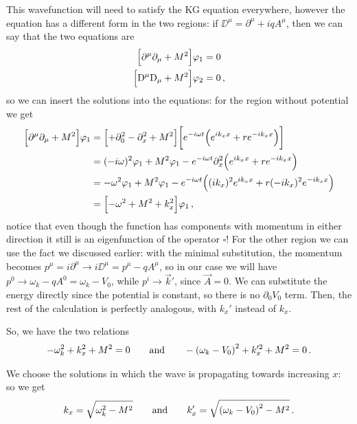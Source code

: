 \documentclass[main.tex]{subfiles}
\begin{document}
This wavefunction will need to satisfy the KG equation everywhere, however the equation has a different form in the two regions: if \(\DD^{\mu } = \partial^{\mu } + iqA^{\mu }\), then we can say that the two equations are 
%
\begin{subequations}
\begin{align}
  \qty[\partial^{\mu } \partial_{\mu } + M^2] \varphi_1 &= 0 \\
  \qty[\mathrm{D}^{\mu } \mathrm{D}_{\mu } + M^2] \varphi_2 &= 0 
\,,
\end{align}
\end{subequations}
%
so we can insert the solutions into the equations: for the region without potential we get
%
\begin{subequations}
\begin{align}
\qty[\partial^{\mu } \partial_{\mu } + M^2] \varphi_1 &= \qty[+ \partial_0^2 - \partial_{x}^2 + M^2 ] \qty[e^{-i \omega t} \qty(e^{ik_{x}x} + r e^{-ik_x x})]   \\
&= (-i\omega)^2 \varphi_1 + M^2 \varphi_1 - e^{-i \omega t}\partial_{x}^2  \qty(e^{ik_{x}x} + r e^{-ik_x x}) \\
&= -\omega^2 \varphi_1 + M^2 \varphi_1 - e^{-i \omega t}  \qty((ik_x)^2 e^{ik_{x}x} + r (-ik_x)^2 e^{-ik_x x}) \\
&= \qty[-\omega^2 + M^2 + k_x^2 ] \varphi_1  
\,,
\end{align}
\end{subequations}
%
notice that even though the function has components with momentum in either direction it still is an eigenfunction of the operator \(\square\)! 
For the other region we can use the fact we discussed earlier: with the minimal substitution, the momentum becomes \(p^{\mu } = i \partial^{\mu } \rightarrow i \DD^{\mu } = p^{\mu } - qA^{\mu }\), so in our case we will have \(p^{0} \rightarrow \omega_{k} - q A^{0} = \omega_{k} - V_0 \), while \(p^{i} \rightarrow \vec{k}'\), since \(\vec{A} = 0\). We can substitute the energy directly since the potential is constant, so there is no \(\partial_0 V_0 \) term. 
Then, the rest of the calculation is perfectly analogous, with \(k_{x}'\) instead of \(k_x\).

So, we have the two relations 
%
\begin{align} \label{eq:dispersion-relation-general}
- \omega_k^2 + k_x^2 + M^2 = 0
\qquad \text{and} \qquad
- \qty(\omega_{k} - V_0 )^2 + k_x^{\prime 2}  + M^2 = 0
\,.
\end{align}

We choose the solutions in which the wave is propagating towards increasing \(x\): so we get 
%
\begin{align}
k_x = \sqrt{\omega_{k}^2  - M^2} 
\qquad \text{and} \qquad
k_x^{\prime} = \sqrt{\qty(\omega_{k} - V_0)^2 - M^2}
\,.
\end{align}
\end{document}
